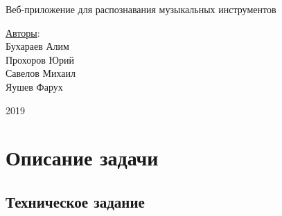 \documentclass[14pt,a4paper]{article}
\begin{document}
\text{}
\vskip 8cm
\begin{center}
\begin{minipage}{0.8\textwidth}
\begin{center}
\Huge Веб-приложение для распознавания музыкальных инструментов
\end{center}
\end{minipage}
\end{center}

\vskip 7cm

\begin{flushright}
\Large \underline{Авторы}: \\
Бухараев Алим \\
Прохоров Юрий \\
Савелов Михаил \\
Яушев Фарух
\end{flushright}

\vskip 3.6cm

\begin{center}
2019
\end{center}

\newpage

\tableofcontents

\newpage 

\section{\huge Описание задачи}

\subsection{Техническое задание}

\newpage

\section{\huge }
\end{document}
